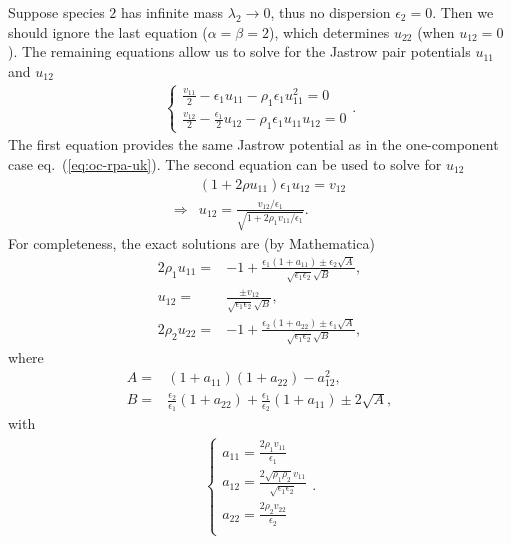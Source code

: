 Suppose species $2$ has infinite mass $\lambda_2\rightarrow0$, thus no dispersion $\epsilon_2=0$. Then we should ignore the last equation ($\alpha=\beta=2$), which determines $u_{22}$ (when $u_{12}=0$). The remaining equations allow us to solve for the Jastrow pair potentials $u_{11}$ and $u_{12}$
\begin{align}
\left\{\begin{array}{l}
\frac{v_{11}}{2} - \epsilon_1 u_{11} - \rho_1\epsilon_1u_{11}^2 = 0 \\
\frac{v_{12}}{2} - \frac{\epsilon_1}{2} u_{12} - \rho_1\epsilon_1u_{11}u_{12} = 0
\end{array}\right..
\end{align}
The first equation provides the same Jastrow potential as in the one-component case eq.~(\ref{eq:oc-rpa-uk}). The second equation can be used to solve for $u_{12}$
\begin{align}
&(1+2\rho u_{11}) \epsilon_1 u_{12} = v_{12} \nonumber \\
\Rightarrow & u_{12} = \frac{v_{12}/\epsilon_1}{\sqrt{1+2\rho_1v_{11}/\epsilon_1}}.
\end{align}
For completeness, the exact solutions are (by Mathematica)
\begin{align}
2\rho_1u_{11} =& -1+\frac{\epsilon_1(1+a_{11}) \pm \epsilon_2\sqrt{A}}
{
\sqrt{\epsilon_1\epsilon_2}\sqrt{B}
},\\
u_{12} =& \frac{\pm v_{12} }{
\sqrt{\epsilon_1\epsilon_2}\sqrt{B}
},\\
2\rho_2u_{22} =& -1+\frac{\epsilon_2(1+a_{22}) \pm \epsilon_1\sqrt{A}}
{
\sqrt{\epsilon_1\epsilon_2}\sqrt{B}
},
\end{align}
where 
\begin{align}
A =& (1+a_{11})(1+a_{22})-a_{12}^2,\\
B =&\frac{\epsilon_2}{\epsilon_1}(1+a_{22}) + \frac{\epsilon_1}{\epsilon_2}(1+a_{11}) \pm 2\sqrt{A},
\end{align}
with
\begin{align}
\left\{\begin{array}{l}
a_{11}=\frac{2\rho_1v_{11}}{\epsilon_1} \\
a_{12}=\frac{2\sqrt{\rho_1\rho_2}v_{11}}{\sqrt{\epsilon_1\epsilon_2}} \\
a_{22}=\frac{2\rho_2v_{22}}{\epsilon_2} \\
\end{array}\right..
\end{align}

